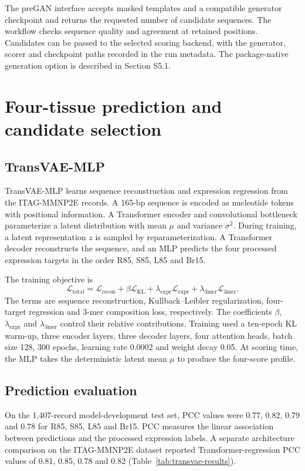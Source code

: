 \documentclass[10pt]{article}
\begin{document}
The preGAN interface accepts masked templates and a compatible generator checkpoint and returns the requested number of candidate sequences. The workflow checks sequence quality and agreement at retained positions. Candidates can be passed to the selected scoring backend, with the generator, scorer and checkpoint paths recorded in the run metadata. The package-native generation option is described in Section S5.1.

\section{Four-tissue prediction and candidate selection}

\subsection{TransVAE-MLP}

TransVAE-MLP learns sequence reconstruction and expression regression from the ITAG-MMNP2E records. A 165-bp sequence is encoded as nucleotide tokens with positional information. A Transformer encoder and convolutional bottleneck parameterize a latent distribution with mean $\mu$ and variance $\sigma^2$. During training, a latent representation $z$ is sampled by reparameterization. A Transformer decoder reconstructs the sequence, and an MLP predicts the four processed expression targets in the order R85, S85, L85 and Br15.

The training objective is
\[
\mathcal{L}_{\mathrm{total}}=\mathcal{L}_{\mathrm{recon}}
+\beta\mathcal{L}_{\mathrm{KL}}
+\lambda_{\mathrm{expr}}\mathcal{L}_{\mathrm{expr}}
+\lambda_{\mathrm{3mer}}\mathcal{L}_{\mathrm{3mer}}.
\]
The terms are sequence reconstruction, Kullback--Leibler regularization, four-target regression and 3-mer composition loss, respectively. The coefficients $\beta$, $\lambda_{\mathrm{expr}}$ and $\lambda_{\mathrm{3mer}}$ control their relative contributions. Training used a ten-epoch KL warm-up, three encoder layers, three decoder layers, four attention heads, batch size 128, 300 epochs, learning rate 0.0002 and weight decay 0.05. At scoring time, the MLP takes the deterministic latent mean $\mu$ to produce the four-score profile.

\subsection{Prediction evaluation}

On the 1,407-record model-development test set, PCC values were 0.77, 0.82, 0.79 and 0.78 for R85, S85, L85 and Br15. PCC measures the linear association between predictions and the processed expression labels. A separate architecture comparison on the ITAG-MMNP2E dataset reported Transformer-regression PCC values of 0.81, 0.85, 0.78 and 0.82 (Table~\ref{tab:transvae-results}).
\end{document}
